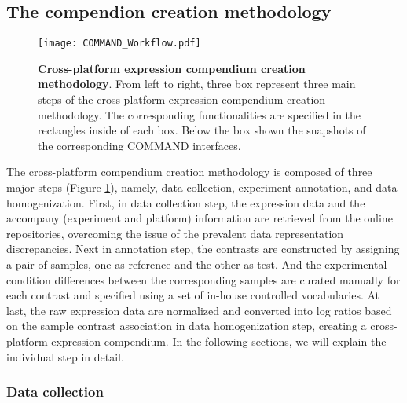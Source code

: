 \subsection{The compendion creation methodology}
\label{sec:colombos-comp-method}

\begin{figure}
  \centering
  \texttt{[image: COMMAND\_Workflow.pdf]}
  \caption[Cross-platform expression compendium creation methodology]{
    \textbf{Cross-platform expression compendium creation methodology}.
    From left to right, three box represent three main steps of the 
    cross-platform expression compendium creation methodology. The 
    corresponding functionalities are specified in the rectangles inside of 
    each box. Below the box shown the snapshots of the corresponding COMMAND 
    interfaces.}
  \label{fig:command-workflow}
\end{figure}


The cross-platform compendium creation methodology is composed of three major
steps (Figure \ref{fig:command-workflow}), namely, data collection, experiment
annotation, and data homogenization.
%
First, in data collection step, the expression data and the accompany
(experiment and platform) information are retrieved from the online
repositories, overcoming the issue of the prevalent data representation
discrepancies.
%
Next in annotation step, the contrasts are constructed by assigning a pair of
samples, one as reference and the other as test. And the experimental condition
differences between the corresponding samples are curated manually for each
contrast and specified using a set of in-house controlled vocabularies.
%
At last, the raw expression data are normalized and converted into log ratios
based on the sample contrast association in data homogenization step, creating
a cross-platform expression compendium.
%
In the following sections, we will explain the individual step in detail.






\subsubsection{Data collection}


